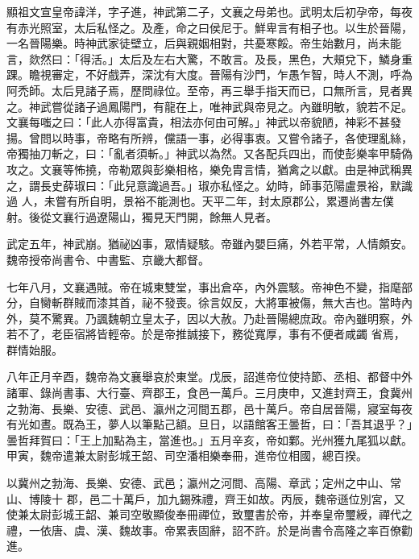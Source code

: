 
\begin{pinyinscope}

 顯祖文宣皇帝諱洋，字子進，神武第二子，文襄之母弟也。武明太后初孕帝，每夜有赤光照室，太后私怪之。及產，命之曰侯尼于。鮮卑言有相子也。以生於晉陽，一名晉陽樂。時神武家徒壁立，后與親姻相對，共憂寒餒。帝生始數月，尚未能言，欻然曰：「得活。」太后及左右大驚，不敢言。及長，黑色，大頰兌下，鱗身重踝。瞻視審定，不好戲弄，深沈有大度。晉陽有沙門，乍愚乍智，時人不測，呼為
 阿禿師。太后見諸子焉，歷問祿位。至帝，再三舉手指天而已，口無所言，見者異之。神武嘗從諸子過鳳陽門，有龍在上，唯神武與帝見之。內雖明敏，貌若不足。文襄每嗤之曰：「此人亦得富貴，相法亦何由可解。」神武以帝貌陋，神彩不甚發揚。曾問以時事，帝略有所辨，儻語一事，必得事衷。又嘗令諸子，各使理亂絲，帝獨抽刀斬之，曰：「亂者須斬。」神武以為然。又各配兵四出，而使彭樂率甲騎偽攻之。文襄等怖撓，帝勒眾與彭樂相格，樂免胄言情，猶禽之以獻。由是神武稱異之，謂長史薛琡曰：「此兒意識過吾。」琡亦私怪之。幼時，師事范陽盧景裕，默識過
 人，未嘗有所自明，景裕不能測也。天平二年，封太原郡公，累遷尚書左僕射。後從文襄行過遼陽山，獨見天門開，餘無人見者。



 武定五年，神武崩。猶祕凶事，眾情疑駭。帝雖內嬰巨痛，外若平常，人情頗安。魏帝授帝尚書令、中書監、京畿大都督。



 七年八月，文襄遇賊。帝在城東雙堂，事出倉卒，內外震駭。帝神色不變，指麾部分，自臠斬群賊而漆其首，祕不發喪。徐言奴反，大將軍被傷，無大吉也。當時內外，莫不驚異。乃諷魏朝立皇太子，因以大赦。乃赴晉陽總庶政。帝內雖明察，外若不了，老臣宿將皆輕帝。於是帝推誠接下，務從寬厚，事有不便者咸蠲
 省焉，群情始服。



 八年正月辛酉，魏帝為文襄舉哀於東堂。戊辰，詔進帝位使持節、丞相、都督中外諸軍、錄尚書事、大行臺、齊郡王，食邑一萬戶。三月庚申，又進封齊王，食冀州之勃海、長樂、安德、武邑、瀛州之河間五郡，邑十萬戶。帝自居晉陽，寢室每夜有光如晝。既為王，夢人以筆點己額。旦日，以語館客王曇哲，曰：「吾其退乎？」曇哲拜賀曰：「王上加點為主，當進也。」五月辛亥，帝如鄴。光州獲九尾狐以獻。甲寅，魏帝遣兼太尉彭城王韶、司空潘相樂奉冊，進帝位相國，總百揆。



 以冀州之勃海、長樂、安德、武邑；瀛州之河間、高陽、章武；定州之中山、常山、博陵十
 郡，邑二十萬戶，加九錫殊禮，齊王如故。丙辰，魏帝遜位別宮，又使兼太尉彭城王韶、兼司空敬顯俊奉冊禪位，致璽書於帝，并奉皇帝璽綬，禪代之禮，一依唐、虞、漢、魏故事。帝累表固辭，詔不許。於是尚書令高隆之率百僚勸進。




\end{pinyinscope}
